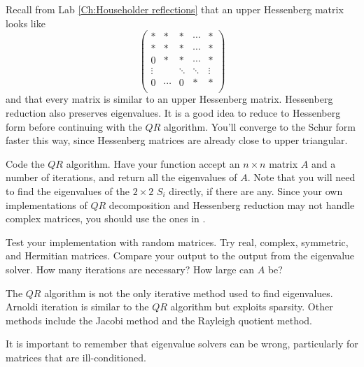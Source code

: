 Recall from Lab \ref{Ch:Householder reflections} that an upper Hessenberg matrix looks like
\[
\begin{pmatrix}
*           & * & \ast & \cdots   & *\\
*           & * & * & \cdots   & * \\
0          & * & * &  \cdots&* \\
\vdots &  & \ddots    & \ddots & \vdots \\
0 & \cdots & 0 & * & *\\
\end{pmatrix} 
\]
and that every matrix is similar to an upper Hessenberg matrix. Hessenberg reduction also preserves eigenvalues. It is a good idea to reduce to Hessenberg form before continuing with the $QR$ algorithm. You'll converge to the Schur form faster this way, since Hessenberg matrices are already close to upper triangular.

\begin{problem}
Code the $QR$ algorithm. Have your function accept an $n \times n$ matrix $A$ and a number of iterations, and return all the eigenvalues of $A$. Note that you will need to find the eigenvalues of the $2 \times 2$ $S_i$ directly, if there are any. Since your own implementations of $QR$ decomposition and Hessenberg reduction may not handle complex matrices, you should use the ones in .
\end{problem}

\begin{comment}

\begin{problem}
If $A$ is normal, its Schur form is diagonal. For normal $A$, have your function additionally output the eigenvector corresponding to each eigenvalue. Hint 1: Test your function on Hermitian and real symmetric matrices; they are both normal. Hint 2: Your work in Problem \ref{problem:similarity proof} will help. You have already made all the necessary calculations, you just need to store the information correctly.
\end{problem}

\end{comment}

\begin{problem}
Test your implementation with random matrices. Try real, complex, symmetric, and Hermitian matrices. Compare your output to the output from the eigenvalue solver. How many iterations are necessary? How large can $A$ be?
\end{problem}

The $QR$ algorithm is not the only iterative method used to find eigenvalues. Arnoldi iteration is similar to the $QR$ algorithm but exploits sparsity. Other methods include the Jacobi method and the Rayleigh quotient method.

It is important to remember that eigenvalue solvers can be wrong, particularly for matrices that are ill-conditioned. 